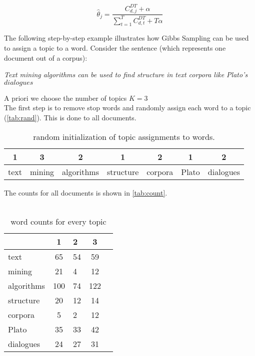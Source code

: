 \documentclass[a4paper,ngerman, english]{atseminar}
\begin{document}
\begin{equation}
\hat{\theta}_j = \frac{C_{d,j}^{DT}+\alpha}{\sum_{t=1}^{T}C_{d,t}^{DT}+T\alpha}
\end{equation}
\vspace{1cm}
\begin{example}
The following step-by-step example illustrates how Gibbs Sampling can be used to assign a topic to a word.
Consider the sentence (which represents one document out of a corpus):

\vspace{1cm}
\textit{Text mining algorithms can be used to find structure in text corpora like Plato’s $dialogues$}
\vspace{1cm}

A priori we choose the number of topics $K=3$
\\
The first step is to remove stop words and randomly assign each word to a topic (\autoref{tab:rand}). This is done to all documents.
\\
\begin{table}[h]
\centering
\caption{random initialization of topic assignments to words.}
\label{tab:rand}
\begin{tabular}{| c | c | c | c | c | c | c | }
\hline
1 & 3 & 2 & 1 & 2 & 1 & 2 \\
\hline 
text & mining & algorithms & structure & corpora & Plato & dialogues \\
\hline
\end{tabular}
\end{table}

The counts for all documents is shown in \autoref{tab:count}.
\\ \\
\begin{table}[h]
\centering
\caption{word counts for every topic}
\label{tab:count}
\begin{tabular}{| l | c l c | c  }
\hline
& \textbf{1} & \textbf{2} & \textbf{3} \\
\hline 
text & 65 & 54 & 59 \\
mining &  21 & 4 & 12 \\
algorithms & 100 & 74 & 122 \\
structure & 20 & 12 & 14 \\
corpora &  5 & 2 & 12 \\
Plato &  35 & 33 & 42 \\
dialogues &  24 & 27 & 31 \\
\hline
\end{tabular}
\end{table}


\end{example}
\end{document}
